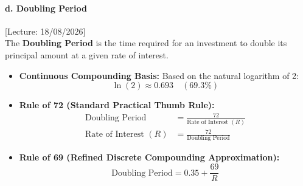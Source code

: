 \begin{formulabox}
\paragraph{d. Doubling Period} \hfill {\scriptsize\color{navyblue}\textsf{[Lecture: 18/08/2026]}} \\
The \textbf{Doubling Period} is the time required for an investment to double its principal amount at a given rate of interest.

\begin{itemize}[leftmargin=*]
    \item \textbf{Continuous Compounding Basis:} Based on the natural logarithm of 2:
    \begin{equation}
        \ln(2) \approx 0.693 \quad (69.3\%)
    \end{equation}

    \item \textbf{Rule of 72 (Standard Practical Thumb Rule):}
    \begin{align}
        \text{Doubling Period} &= \frac{72}{\text{Rate of Interest } (R)} \\[0.4em]
        \text{Rate of Interest } (R) &= \frac{72}{\text{Doubling Period}}
    \end{align}

    \item \textbf{Rule of 69 (Refined Discrete Compounding Approximation):}
    \begin{equation}
        \text{Doubling Period} = 0.35 + \frac{69}{R}
    \end{equation}
\end{itemize}
\end{formulabox}

